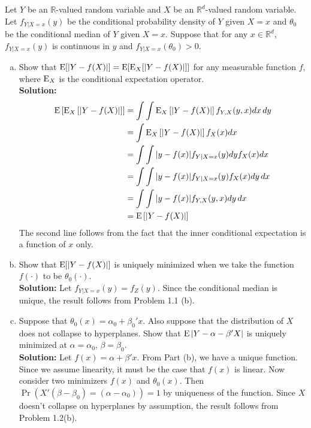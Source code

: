\documentclass[11pt,letterpaper]{article}                  %
\begin{document}
\bigskip
\begin{problem}
Let $Y$ be an $\mathbb{R}$-valued random variable and $X$ be an $\mathbb{R}^d$-valued random variable.
Let $f_{Y|X=x} (y)$ be the conditional probability density of $Y$ given $X=x$ and $\theta_0$ be the conditional median of $Y$ given $X=x$.
Suppose that for any $x \in \mathbb{R}^d$, $f_{Y|X=x} (y)$ is continuous in $y$ and $f_{Y|X=x} (\theta_0) > 0$.
\begin{enumerate}[(a)]
	\item 
	Show that $\operatorname{E} [|Y - f(X)|] = \operatorname{E} [ \operatorname{E}_X [|Y - f(X)|]]$ for any measurable function $f$, where $\operatorname{E}_X$ is the conditional expectation operator. \\

	\textbf{Solution:}
	\begin{align*}
		\operatorname{E} \left[ \operatorname{E}_X \left[ |Y - f(X)| \right] \right] &= \int \int \operatorname{E}_X \left[ |Y - f(X)| \right] f_{Y,X} (y,x) dx \, dy\\
		&= \int \operatorname{E}_X \left[ |Y - f(X)| \right] f_X (x) dx \\
		&= \int \int |y - f(x)| f_{Y | X=x} (y) dy f_X (x) dx \\
		&= \int \int |y - f(x)| f_{Y | X=x} (y) f_X (x) dy \, dx \\
		&= \int \int |y - f(x)| f_{Y, X} (y,x) dy \, dx \\
		&= \operatorname{E} \left[ |Y - f(X)| \right]
	\end{align*}
	The second line follows from the fact that the inner conditional expectation is a function of $x$ only.

	\item 
	Show that $\operatorname{E} [|Y - f(X)|]$ is uniquely minimized when we take the function $f(\cdot)$ to be $\theta_0 (\cdot)$.
	\\

	\textbf{Solution:}
	Let $f_{Y|X=x} (y) = f_Z (y)$.
	Since the conditional median is unique, the result follows from Problem 1.1 (b).

	\item 
	Suppose that $\theta_0(x) = \alpha_0 + \beta_0'x$.
	Also suppose that the distribution of $X$ does not collapse to hyperplanes.
	Show that $\operatorname{E} \left| Y - \alpha - \beta'X \right|$ is uniquely minimized at $\alpha = \alpha_0$, $\beta = \beta_0$.
	\\

	\textbf{Solution:} Let $f(x) = \alpha + \beta' x$.
	From Part (b), we have a unique function.
	Since we assume linearity, it must be the case that $f(x)$ is linear.
	Now consider two minimizers $f(x)$ and $\theta_0(x)$.
	Then $\Pr (X'(\beta-\beta_0) = (\alpha-\alpha_0)) = 1$ by uniqueness of the function.
	Since $X$ doesn't collapse on hyperplanes by assumption, the result follows from Problem 1.2(b).

\end{enumerate}
\end{problem}
\end{document}
